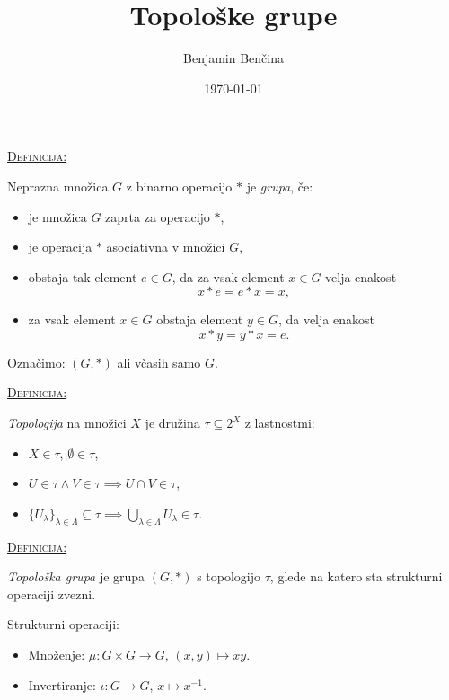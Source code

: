\documentclass[a4paper, 12pt]{beamer}
\title{Topološke grupe}
\author{Benjamin Benčina}
\institute[FMF]{Fakulteta za matematiko in fiziko}
\date{\today}
\newenvironment{matematika}[1]{
\textcolor{bostonuniversityred}{\underline{\textsc{#1:}}}
}{
}
\begin{document}



\titlepage

\begin{frame}
\begin{matematika}{Definicija}
Neprazna množica $G$ z binarno operacijo $*$ je \emph{grupa}, če:
\begin{itemize}[label=]
\item je množica $G$ zaprta za operacijo $*$,
\item je operacija $*$ asociativna v množici $G$,
\item obstaja tak element $e \in G$, da za vsak element $x \in G$ velja enakost 
\[ x*e = e*x = x, \]
\item za vsak element $x \in G$ obstaja element $y \in G$, da velja enakost
\[ x*y = y*x = e. \]
\end{itemize}
Označimo: $(G, *)$ ali včasih samo $G$.
\end{matematika}
\end{frame}

\begin{frame}
\begin{matematika}{Definicija}
\emph{Topologija} na množici $X$ je družina $\tau \subseteq 2^{X}$ z lastnostmi:
\begin{itemize}[label=]
\item $X \in \tau$, $\emptyset \in \tau$,
\item $U \in \tau \wedge V \in \tau \implies U \cap V \in \tau$,
\item $\lbrace U_{\lambda} \rbrace_{\lambda \in \Lambda} \subseteq \tau \implies \bigcup\limits_{\lambda \in \Lambda}^{} U_{\lambda} \in \tau$.
\end{itemize}
\end{matematika}
\end{frame}

\begin{frame}
\begin{matematika}{Definicija}
\emph{Topološka grupa} je grupa $(G, *)$ s topologijo $\tau$, glede na katero sta strukturni operaciji zvezni.
\end{matematika}
\newline
\newline
Strukturni operaciji:
\begin{itemize}[label=]
\item Množenje: $\mu : G \times G \to G$, $(x, y) \mapsto xy$.
\item Invertiranje: $\iota : G \to G$, $x \mapsto x^{-1}$.
\end{itemize}

\end{frame}
\end{document}
